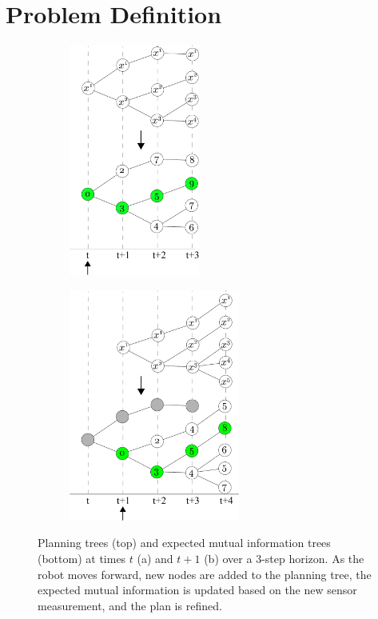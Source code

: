 \section{Problem Definition}

\begin{figure}[t]
  \centering
  \begin{subfigure}[b]{0.3\textwidth}
    \label{fig:plan_at_t0}
    \includegraphics[height=3in]{plan_at_t0}
    \caption{}
  \end{subfigure}
  \hspace{1in}
  \begin{subfigure}[b]{0.3\textwidth}
    \label{fig:plan_at_t1}
    \includegraphics[height=3in]{plan_at_t1}
    \caption{}
  \end{subfigure}
  \caption{Planning trees (top) and expected mutual information trees (bottom) at times $t$ (a) and $t+1$ (b) over a 3-step horizon. As the robot moves forward, new nodes are added to the planning tree, the expected mutual information is updated based on the new sensor measurement, and the plan is refined. \label{fig:plan}}
\end{figure}


